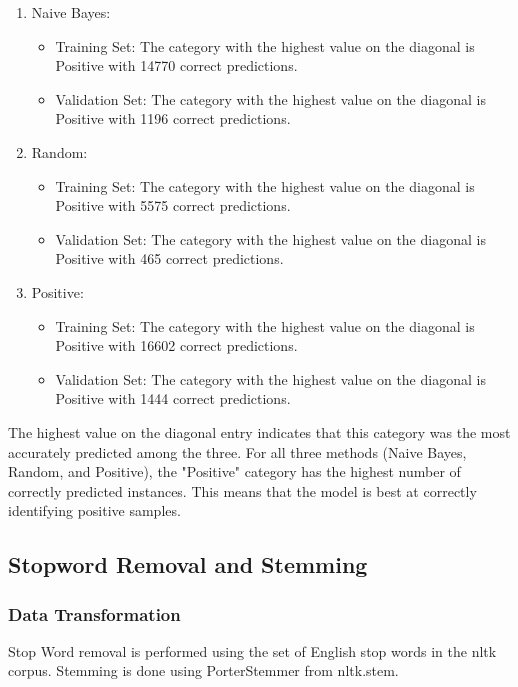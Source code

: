 \documentclass[12pt,a4paper]{article}
\begin{document}
\begin{enumerate}
	\item Naive Bayes:

\begin{itemize}
		\item Training Set: The category with the highest value on the diagonal is Positive with 14770 correct predictions.
		\item Validation Set: The category with the highest value on the diagonal is Positive with 1196 correct predictions.
\end{itemize}

	\item Random:

\begin{itemize}
		\item Training Set: The category with the highest value on the diagonal is Positive with 5575 correct predictions.
		\item Validation Set: The category with the highest value on the diagonal is Positive with 465 correct predictions.
\end{itemize}

	\item Positive:

\begin{itemize}
		\item Training Set: The category with the highest value on the diagonal is Positive with 16602 correct predictions.
		\item Validation Set: The category with the highest value on the diagonal is Positive with 1444 correct predictions.
\end{itemize}

\end{enumerate}
The highest value on the diagonal entry indicates that this category was the most accurately predicted among the three. For all three methods (Naive Bayes, Random, and Positive), the "Positive" category has the highest number of correctly predicted instances. This means that the model is best at correctly identifying positive samples.




\subsection{Stopword Removal and Stemming}
\subsubsection{Data Transformation}
Stop Word removal is performed using the set of English stop words in the nltk corpus. Stemming is done using PorterStemmer from nltk.stem.
\end{document}
